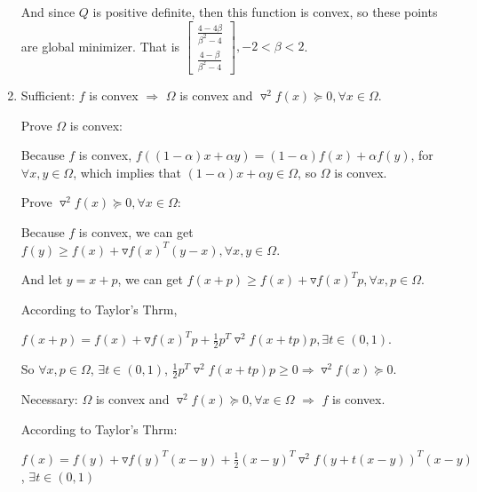 \documentclass[12pt]{article}
\begin{document}
\begin{enumerate}
And since $Q$ is positive definite, then this function is convex, so these points are global minimizer. That is $\begin{bmatrix} \frac{4 - 4\beta}{\beta^2 - 4} \\ \frac{4 - \beta}{\beta^2 - 4} \end{bmatrix} , -2 < \beta < 2$.






\bigskip
\item

Sufficient: $f$ is convex $\Longrightarrow$ $\Omega$ is convex and $\triangledown^2 f(x) \succeq 0, \forall x \in \Omega$.

Prove $\Omega$ is convex:

Because $f$ is convex, $f((1-\alpha)x+\alpha y) = (1-\alpha) f(x) + \alpha f(y)$, for $\forall x, y \in \Omega$, which implies that $(1-\alpha)x+\alpha y \in \Omega$, so $\Omega$ is convex.

Prove $\triangledown^2 f(x) \succeq 0, \forall x \in \Omega$:

Because $f$ is convex, we can get $f(y) \ge f(x) + \triangledown f(x)^T (y-x), \forall x, y \in \Omega$.

And let $y=x+p$, we can get $f(x+p) \ge f(x) + \triangledown f(x)^T p, \forall x, p \in \Omega$.

According to Taylor's Thrm,

$f(x+p) = f(x) + \triangledown f(x)^T p + \frac{1}{2} p^T \triangledown^2 f(x+tp)p, \exists t \in (0,1)$.

So $\forall x, p \in \Omega$, $\exists t \in (0,1)$, $ \frac{1}{2} p^T \triangledown^2 f(x+tp)p \ge 0 \Longrightarrow \triangledown^2f(x) \succeq 0$.

\bigskip

Necessary: $\Omega$ is convex and $\triangledown^2 f(x) \succeq 0, \forall x \in \Omega$ $\Longrightarrow$ $f$ is convex.

According to Taylor's Thrm:

$f(x) = f(y) + \triangledown f(y)^T (x-y) + \frac{1}{2} (x-y)^T \triangledown^2 f(y + t(x-y))^T (x-y)$, $\exists t \in (0,1)$


\end{enumerate}
\end{document}
